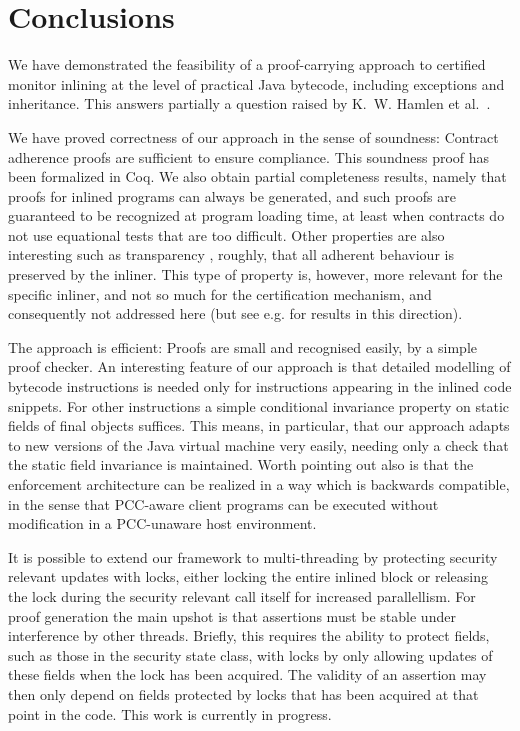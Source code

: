 \documentclass[10pt,twocolumn]{article}
\begin{document}
\section{Conclusions}
We have demonstrated the feasibility of a proof-carrying approach to certified monitor inlining at the level of practical Java bytecode, including exceptions and inheritance. This answers partially a question raised by K.~W. Hamlen et al.~\cite{HamMor06}.

We have proved correctness of our approach in the sense of soundness: Contract adherence proofs are sufficient to ensure compliance. This soundness proof has been formalized \cite{coqscript} in Coq.
We also obtain partial completeness results, namely that proofs for inlined 
programs can always be generated, and such proofs are guaranteed to be 
recognized at program loading time, at least when contracts do not use
equational tests that are too difficult. Other properties are also interesting 
such as transparency \cite{saltzer75}, roughly, that all adherent behaviour is preserved by the inliner. This type of property is, however, more relevant for the specific inliner, and not so much for the certification mechanism, and consequently not addressed here (but see e.g. \cite{Lig06,VanPie08,DamJLP10,DamJLP09} for results in  this direction).

The approach is efficient: Proofs are small and recognised easily, by a simple proof checker. An interesting feature of our approach is that detailed modelling of bytecode instructions is needed only for instructions appearing in the inlined code snippets. For other instructions a simple conditional invariance property on static fields of final objects suffices. This means, in particular, that our approach adapts to new versions of the Java virtual machine very easily, needing only a check that the static field invariance is maintained. Worth pointing out also is that the enforcement architecture can be realized in a way which is backwards compatible, in the sense that PCC-aware client programs can be executed without modification in a PCC-unaware host environment.

It is possible to extend our framework to multi-threading by protecting security relevant updates with locks, either locking the entire inlined block or releasing the lock during the security relevant call itself for increased parallellism. For proof generation the main upshot is that assertions must be stable under interference by other threads. Briefly, this requires the ability to protect fields, such as those in the security state class, with locks by only allowing updates of these fields when the lock has been acquired. The validity of an assertion may then only depend on fields protected by locks that has been acquired at that point in the code. This work is currently in progress.
\end{document}
